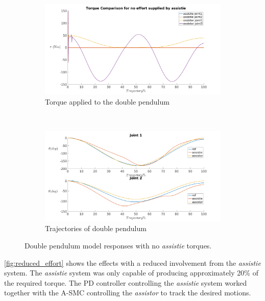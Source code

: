 \begin{figure}[h!]
    \centering
    \begin{subfigure}{0.5\textwidth}
        \centering
        \includegraphics[width=\linewidth]{images/controllers/none_torque.png}
        \caption[Double Pendulum: No Torque-Effort]{Torque applied to the double pendulum}
        \label{fig:no_effort_torque}
    \end{subfigure}%
    ~
    \begin{subfigure}{0.5\textwidth}
        \centering
        \includegraphics[width=\linewidth]{images/controllers/none_traj.png}
        \caption[Double Pendulum: No Torque-Trajectory]{Trajectories of double pendulum}
        \label{fig:no_effort_traj}
    \end{subfigure}
    \caption[Double Pendulum: No Torque]{Double pendulum model responses with no \textit{assistie} torques.}
    \label{fig:no_effort}
\end{figure}

\autoref{fig:reduced_effort} shows the effects with a reduced involvement from the \textit{assistie} system. The \textit{assistie} system was only capable of producing approximately 20\%  of the required torque. The PD controller controlling the \textit{assistie} system worked together with the A-SMC controlling the \textit{assistor} to track the desired motions.

